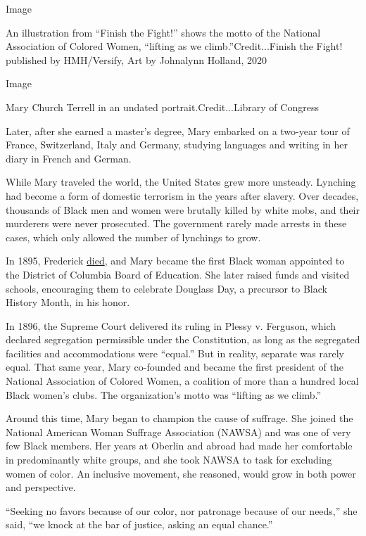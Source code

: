 Image

An illustration from ``Finish the Fight!'' shows the motto of the
National Association of Colored Women, ``lifting as we
climb.''Credit...Finish the Fight! published by HMH/Versify, Art by
Johnalynn Holland, 2020

Image

Mary Church Terrell in an undated portrait.Credit...Library of Congress

Later, after she earned a master's degree, Mary embarked on a two-year
tour of France, Switzerland, Italy and Germany, studying languages and
writing in her diary in French and German.

While Mary traveled the world, the United States grew more unsteady.
Lynching had become a form of domestic terrorism in the years after
slavery. Over decades, thousands of Black men and women were brutally
killed by white mobs, and their murderers were never prosecuted. The
government rarely made arrests in these cases, which only allowed the
number of lynchings to grow.

In 1895, Frederick
\href{https://www.nytimes.com/2019/02/14/obituaries/frederick-douglass-dead-1895.html}{died},
and Mary became the first Black woman appointed to the District of
Columbia Board of Education. She later raised funds and visited schools,
encouraging them to celebrate Douglass Day, a precursor to Black History
Month, in his honor.

In 1896, the Supreme Court delivered its ruling in Plessy v. Ferguson,
which declared segregation permissible under the Constitution, as long
as the segregated facilities and accommodations were ``equal.'' But in
reality, separate was rarely equal. That same year, Mary co-founded and
became the first president of the National Association of Colored Women,
a coalition of more than a hundred local Black women's clubs. The
organization's motto was ``lifting as we climb.''

Around this time, Mary began to champion the cause of suffrage. She
joined the National American Woman Suffrage Association (NAWSA) and was
one of very few Black members. Her years at Oberlin and abroad had made
her comfortable in predominantly white groups, and she took NAWSA to
task for excluding women of color. An inclusive movement, she reasoned,
would grow in both power and perspective.

``Seeking no favors because of our color, nor patronage because of our
needs,'' she said, ``we knock at the bar of justice, asking an equal
chance.''

